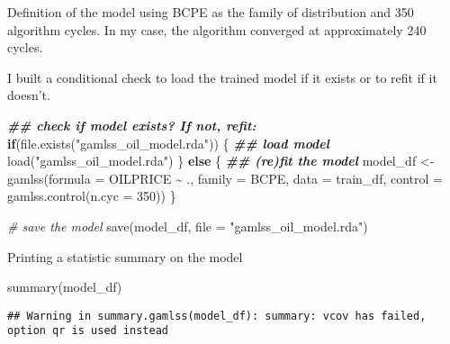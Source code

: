 \documentclass[
]{article}
\newenvironment{Shaded}{\begin{snugshade}}{\end{snugshade}}
\newcommand{\AttributeTok}[1]{\textcolor[rgb]{0.77,0.63,0.00}{#1}}
\newcommand{\CommentTok}[1]{\textcolor[rgb]{0.56,0.35,0.01}{\textit{#1}}}
\newcommand{\ControlFlowTok}[1]{\textcolor[rgb]{0.13,0.29,0.53}{\textbf{#1}}}
\newcommand{\DecValTok}[1]{\textcolor[rgb]{0.00,0.00,0.81}{#1}}
\newcommand{\DocumentationTok}[1]{\textcolor[rgb]{0.56,0.35,0.01}{\textbf{\textit{#1}}}}
\newcommand{\FunctionTok}[1]{\textcolor[rgb]{0.00,0.00,0.00}{#1}}
\newcommand{\NormalTok}[1]{#1}
\newcommand{\OtherTok}[1]{\textcolor[rgb]{0.56,0.35,0.01}{#1}}
\newcommand{\SpecialCharTok}[1]{\textcolor[rgb]{0.00,0.00,0.00}{#1}}
\newcommand{\StringTok}[1]{\textcolor[rgb]{0.31,0.60,0.02}{#1}}
\begin{document}
Definition of the model using BCPE as the family of distribution and 350
algorithm cycles. In my case, the algorithm converged at approximately
240 cycles.

I built a conditional check to load the trained model if it exists or to
refit if it doesn't.

\begin{Shaded}
\begin{Highlighting}[]
\DocumentationTok{\#\# check if model exists? If not, refit:}
\ControlFlowTok{if}\NormalTok{(}\FunctionTok{file.exists}\NormalTok{(}\StringTok{"gamlss\_oil\_model.rda"}\NormalTok{)) \{}
    \DocumentationTok{\#\# load model}
    \FunctionTok{load}\NormalTok{(}\StringTok{"gamlss\_oil\_model.rda"}\NormalTok{)}
\NormalTok{\} }\ControlFlowTok{else}\NormalTok{ \{}
    \DocumentationTok{\#\# (re)fit the model}
\NormalTok{    model\_df }\OtherTok{\textless{}{-}} \FunctionTok{gamlss}\NormalTok{(}\AttributeTok{formula =}\NormalTok{ OILPRICE }\SpecialCharTok{\textasciitilde{}}\NormalTok{ ., }\AttributeTok{family =}\NormalTok{ BCPE, }\AttributeTok{data =}\NormalTok{ train\_df, }\AttributeTok{control =} \FunctionTok{gamlss.control}\NormalTok{(}\AttributeTok{n.cyc =} \DecValTok{350}\NormalTok{)) }
\NormalTok{\}}

\CommentTok{\# save the model}
\FunctionTok{save}\NormalTok{(model\_df, }\AttributeTok{file =} \StringTok{"gamlss\_oil\_model.rda"}\NormalTok{)}
\end{Highlighting}
\end{Shaded}

Printing a statistic summary on the model

\begin{Shaded}
\begin{Highlighting}[]
\FunctionTok{summary}\NormalTok{(model\_df)}
\end{Highlighting}
\end{Shaded}

\begin{verbatim}
## Warning in summary.gamlss(model_df): summary: vcov has failed, option qr is used instead
\end{verbatim}
\end{document}
